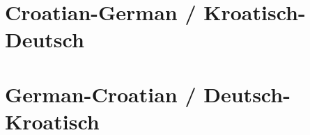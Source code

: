 
\section{Croatian-German / Kroatisch-Deutsch}








\section{German-Croatian / Deutsch-Kroatisch}




